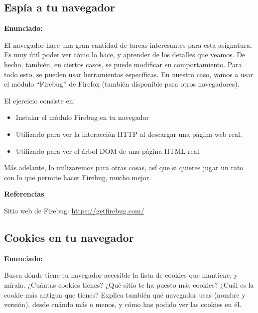\subsection{Espía a tu navegador}
\label{subsec:firebug}

\textbf{Enunciado:}

El navegador hace una gran cantidad de tareas interesantes para esta asignatura. Es muy útil poder ver cómo lo hace, y aprender de los detalles que veamos. De hecho, también, en ciertos casos, se puede modificar su comportamiento. Para todo esto, se pueden usar herramientas específicas. En nuestro caso, vamos a usar el módulo ``Firebug'' de Firefox (también disponible para otros navegadores).

El ejercicio consiste en:

\begin{itemize}
\item Instalar el módulo Firebug en tu navegador
\item Utilizarlo para ver la interacción HTTP al descargar una página web real.
\item Utilizarlo para ver el árbol DOM de una página HTML real.
\end{itemize}

Más adelante, lo utilizaremos para otras cosas, así que si quieres jugar un rato con lo que permite hacer Firebug, mucho mejor.

\textbf{Referencias}

Sitio web de Firebug: \url{https://getfirebug.com/}


\subsection{Cookies en tu navegador}
\label{subsec:cookies-navegador}

\textbf{Enunciado:}

Busca dónde tiene tu navegador accesible la lista de cookies que mantiene, y mírala. ¿Cuántas cookies tienes? ¿Qué sitio te ha puesto más cookies? ¿Cuál es la cookie más antigua que tienes? Explica también qué navegador usas (nombre y versión), desde cuándo más o menos, y cómo has podido ver las cookies en él.



